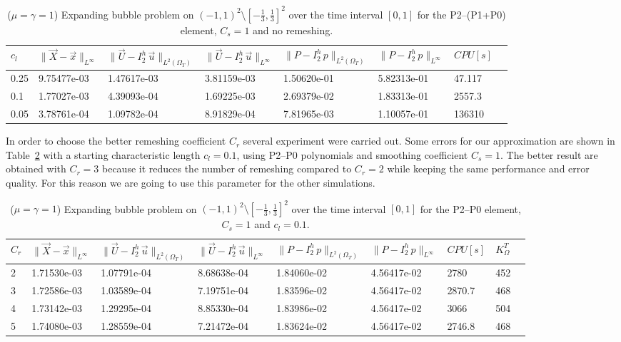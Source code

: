 \documentclass[a4paper,12pt,onecolumn]{article}
\newcommand{\errorXx}{\|\vec{X} - \vec{x}\|_{L^\infty}}
\newcommand{\LerrorUu}[1]{\|\vec U - I^h_{#1}\,\vec u\|_{L^2(\Omega_T)}}
\newcommand{\errorUu}[1]{\|\vec U - I^h_{#1}\,\vec u\|_{L^\infty}}
\newcommand{\errorPp}[1]{\|P - I^h_{#1}\,p\|_{L^\infty}}
\newcommand{\LerrorPp}[1]{\|P - I^h_{#1}\,p\|_{L^2(\Omega_T)}}
\begin{document}
\begin{table}
 \center
 \hspace*{-2cm}
\begin{tabular}{llllllll}
\hline
$c_l$ & $\errorXx$ & $\LerrorUu2$ & $\errorUu2$ & $\LerrorPp2$ & $\errorPp2$ & $CPU[s]$\\
\hline
0.25 & 9.75477e-03 & 1.47617e-03 & 3.81159e-03 & 1.50620e-01 & 5.82313e-01 & 47.117\\
0.1 & 1.77027e-03 & 4.39093e-04 & 1.69225e-03 & 2.69379e-02 & 1.83313e-01 & 2557.3\\
0.05 & 3.78761e-04 & 1.09782e-04 & 8.91829e-04 & 7.81965e-03 & 1.10057e-01 & 136310\\
\hline
\end{tabular}
\hspace*{-2cm}
\caption{($\mu=\gamma=1$) Expanding bubble problem on $(-1,1)^2\setminus[-\frac{1}{3},\frac{1}{3}]^2$ over the time interval $[0,1]$ for the P2--(P1+P0) element, $C_s=1$ and no remeshing.}
\label{tab:expandingbubble2Dp2p1p0smooth}
\end{table}

In order to choose the better remeshing coefficient $C_r$ several experiment were carried out. Some errors for our approximation are shown in Table~\ref{tab:expandingbubble2Dp2p0bothdiffcr} with a starting characteristic length $c_l=0.1$, using P2--P0 polynomials and smoothing coefficient $C_s=1$. The better result are obtained with $C_r=3$ because it reduces the number of remeshing compared to $C_r=2$ while keeping the same performance and error quality. For this reason we are going to use this parameter for the other simulations.

\begin{table}
 \center
 \hspace*{-2cm}
\begin{tabular}{lllllllll}
\hline
$C_r$ & $\errorXx$ & $\LerrorUu2$ & $\errorUu2$ & $\LerrorPp2$ & $\errorPp2$ & $CPU[s]$ & $K_\Omega^T$\\
\hline
2 & 1.71530e-03 & 1.07791e-04 & 8.68638e-04 & 1.84060e-02 & 4.56417e-02 & 2780 & 452\\
3 & 1.72586e-03 & 1.03589e-04 & 7.19751e-04 & 1.83596e-02 & 4.56417e-02 & 2870.7 & 468\\
4 & 1.73142e-03 & 1.29295e-04 & 8.85330e-04 & 1.83986e-02 & 4.56417e-02 & 3066 & 504\\
5 & 1.74080e-03 & 1.28559e-04 & 7.21472e-04 & 1.83624e-02 & 4.56417e-02 & 2746.8 & 468\\
\hline
\end{tabular}
\hspace*{-2cm}
\caption{($\mu=\gamma=1$) Expanding bubble problem on $(-1,1)^2\setminus[-\frac{1}{3},\frac{1}{3}]^2$ over the time interval $[0,1]$ for the P2--P0 element, $C_s=1$ and $c_l=0.1$.}
\label{tab:expandingbubble2Dp2p0bothdiffcr}
\end{table}
\end{document}
